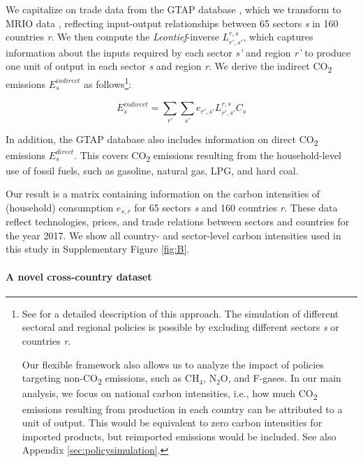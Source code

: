 \documentclass[12pt, a4paper]{article}
\begin{document}
We capitalize on trade data from the GTAP database \autocite[Version 11B, ][]{Aguiar.2022}, which we transform to MRIO data \autocite{Peters.2011}, reflecting input-output relationships between 65 sectors \textit{s} in 160 countries \textit{r}. We then compute the \textit{Leontief}-inverse $L_{r',s'}^{r,s}$, which captures information about the inputs required by each sector \textit{s'} and region \textit{r'} to produce one unit of output in each sector \textit{s} and region \textit{r}. We derive the indirect CO\textsubscript{2} emissions $E_{s}^{indirect}$ as follows\footnote{See \textcite{Missbach.2024, Steckel.2021b,Feindt.2021,VogtSchilb.2019} for a detailed description of this approach. The simulation of different sectoral and regional policies is possible by excluding different sectors \textit{s} or countries \textit{r}. 

Our flexible framework also allows us to analyze the impact of policies targeting non-CO\textsubscript{2} emissions, such as CH$_{4}$, N$_{2}$O, and F-gases. In our main analysis, we focus on national carbon intensities, i.e., how much CO\textsubscript{2} emissions resulting from production in each country can be attributed to a unit of output. This would be equivalent to zero carbon intensities for imported products, but reimported emissions would be included. See also Appendix \ref{sec:policysimulation}.}:

\begin{equation}
    E_{s}^{indirect} = \sum_{r'} \sum_{s'} e_{r',s'} L_{r',s'}^{r,s} C_{s}
\end{equation}

In addition, the GTAP database also includes information on direct CO\textsubscript{2} emissions $E_{s}^{direct}$. This covers CO\textsubscript{2} emissions resulting from the household-level use of fossil fuels, such as gasoline, natural gas, LPG, and hard coal.

Our result is a matrix containing information on the carbon intensities of (household) consumption $e_{s,r}$ for 65 sectors \textit{s} and 160 countries \textit{r}. These data reflect technologies, prices, and trade relations between sectors and countries for the year 2017. We show all country- and sector-level carbon intensities used in this study in Supplementary Figure \ref{fig:B}.

\paragraph{A novel cross-country dataset} 
\end{document}

